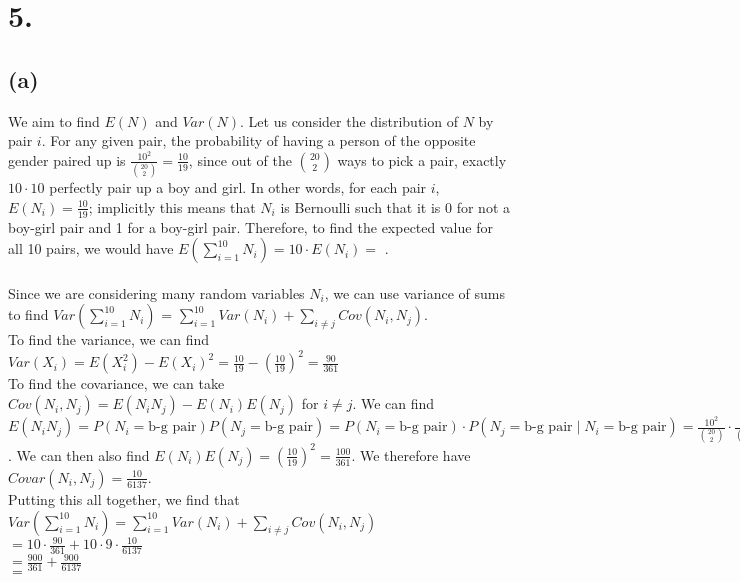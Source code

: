 \documentclass{article}
\begin{document}
\section*{5.}
{\Large 

\subsection*{(a)}
We aim to find $E(N)$ and $Var(N)$. Let us consider the distribution of $N$ by pair $i$. For any given pair, the probability of having a person of the opposite gender paired up is $\frac{10^2}{\binom{20}{2}} = \frac{10}{19}$, since out of the $\binom{20}{2}$ ways to pick a pair, exactly $10 \cdot 10$ perfectly pair up a boy and girl. In other words, for each pair $i$, $E(N_i) = \frac{10}{19}$; implicitly this means that $N_i$ is Bernoulli such that it is 0 for not a boy-girl pair and 1 for a boy-girl pair. Therefore, to find the expected value for all 10 pairs, we would have $E(\sum_{i=1}^{10}N_i) = 10 \cdot E(N_i) =$ . \\ \\
Since we are considering many random variables $N_i$, we can use variance of sums to find $Var(\sum_{i=1}^{10}N_i)$ = $\sum_{i=1}^{10} Var(N_i) + \sum_{i \neq j}Cov(N_i, N_j)$. \\
To find the variance, we can find $Var(X_i) = E(X_i^2) - E(X_i)^2 = \frac{10}{19} - (\frac{10}{19})^2 = \frac{90}{361}$ \\
To find the covariance, we can take $Cov(N_i, N_j) = E(N_iN_j) - E(N_i)E(N_j)$ for $i \neq j$. We can find $E(N_iN_j) = P(N_i = \text{b-g pair})P(N_j = \text{b-g pair}) = P(N_i = \text{b-g pair}) \cdot P(N_j = \text{b-g pair} \mid N_i = \text{b-g pair}) = \frac{10^2}{\binom{20}{2}} \cdot \frac{9^2}{\binom{18}{2}} = \frac{10}{19} \cdot \frac{9}{17} = \frac{90}{323}$. We can then also find $E(N_i)E(N_j) = (\frac{10}{19})^2 = \frac{100}{361}$. We therefore have $Covar(N_i, N_j) = \frac{10}{6137}$. \\ 
Putting this all together, we find that \\
$Var(\sum_{i=1}^{10}N_i) = \sum_{i=1}^{10} Var(N_i) + \sum_{i \neq j}Cov(N_i, N_j)$ \\ 
$= 10 \cdot \frac{90}{361} + 10 \cdot 9 \cdot \frac{10}{6137}$ \\ 
$= \frac{900}{361} + \frac{900}{6137}$ \\
$= $ 
 
}
\end{document}
